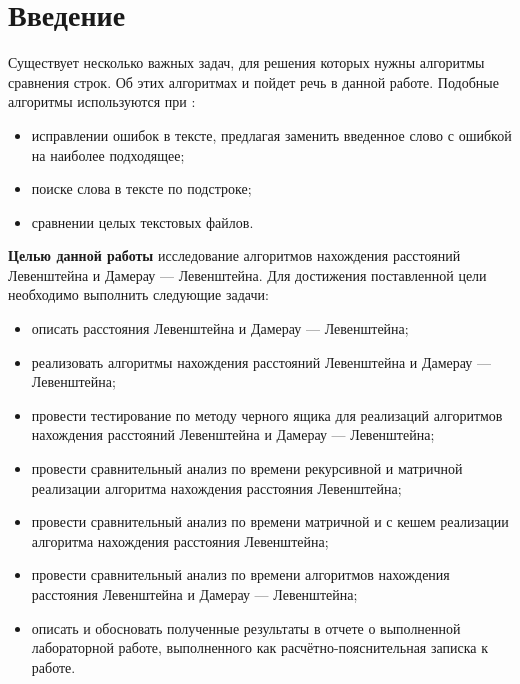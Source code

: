 \chapter*{Введение}

Существует несколько важных задач, для решения которых нужны алгоритмы сравнения строк. Об этих алгоритмах и пойдет речь в данной работе. 
Подобные алгоритмы используются при \cite{dlbook}:

\begin{itemize}[label={---}]
	\item исправлении ошибок в тексте, предлагая заменить введенное слово с ошибкой на наиболее подходящее;
	
	\item поиске слова в тексте по подстроке;
	
	\item сравнении целых текстовых файлов. \newline
\end{itemize}

\textbf{Целью данной работы} исследование алгоритмов нахождения расстояний Левенштейна и Дамерау --- Левенштейна. 
Для достижения поставленной цели необходимо выполнить следующие задачи:

\begin{itemize}[label={---}]
	\item описать расстояния Левенштейна и Дамерау --- Левенштейна;
	\item реализовать алгоритмы нахождения расстояний Левенштейна и Дамерау --- Левенштейна;
	
	\item провести тестирование по методу черного ящика для реализаций алгоритмов нахождения расстояний Левенштейна и Дамерау --- Левенштейна;
	
	\item провести сравнительный анализ по времени рекурсивной и матричной реализации алгоритма нахождения расстояния Левенштейна;
	
	\item провести сравнительный анализ по времени матричной и с кешем реализации алгоритма нахождения расстояния Левенштейна;
	
	\item провести сравнительный анализ по времени алгоритмов нахождения расстояния Левенштейна и Дамерау --- Левенштейна;
	
	\item описать и обосновать полученные результаты в отчете о выполненной лабораторной работе, выполненного как расчётно-пояснительная записка к работе.
\end{itemize}
